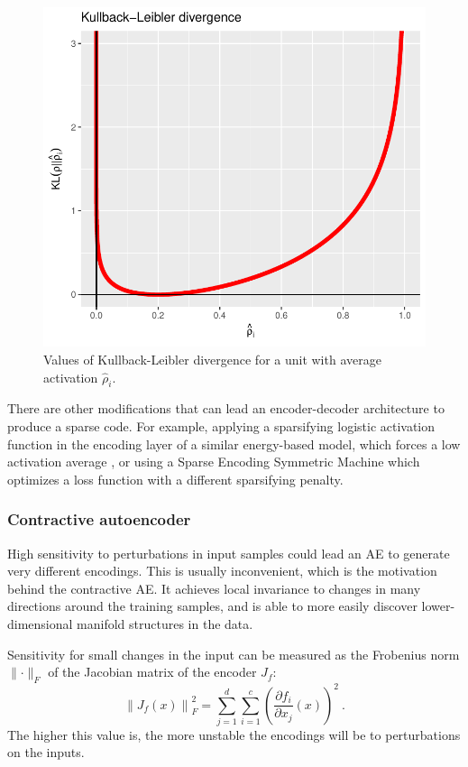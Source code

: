 \documentclass[preprint,5p,compress]{elsarticle}
\begin{document}
\begin{figure}[ht!]
	\centering
	\includegraphics[width=0.9\linewidth]{kldivergence.pdf} 

	\caption{Values of Kullback-Leibler divergence for a unit with average activation $\hat\rho_i$.}
	\label{Fig.KLdivergence}
\end{figure}


There are other modifications that can lead an encoder-decoder architecture to produce a sparse code. For example, applying a sparsifying logistic activation function in the encoding layer of a similar energy-based model, which forces a low activation average \cite{SparsifyingLogistic}, or using a Sparse Encoding Symmetric Machine \cite{SESM} which optimizes a loss function with a different sparsifying penalty.

\subsubsection{Contractive autoencoder}

High sensitivity to perturbations in input samples could lead an AE to generate very different encodings. This is usually inconvenient, which is the motivation behind the contractive AE. It achieves local invariance to changes in many directions around the training samples, and is able to more easily discover lower-dimensional manifold structures in the data.

Sensitivity for small changes in the input can be measured as the Frobenius norm $\lVert\cdot\rVert_F$ of the Jacobian matrix of the encoder $J_f$:
\begin{equation}
  \left\lVert J_f(x) \right\rVert_F^2=
  \sum_{j=1}^d\sum_{i=1}^c \left(\frac{\partial f_i}{\partial x_j}\left(x\right)\right)^2~.
\end{equation}
The higher this value is, the more unstable the encodings will be to perturbations on the inputs.
\end{document}
